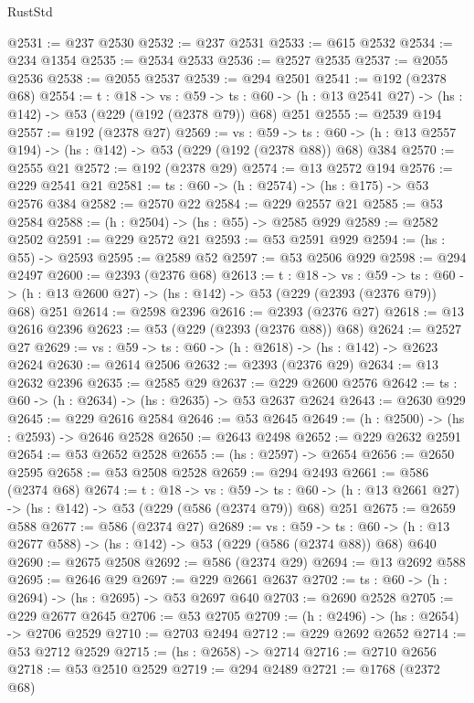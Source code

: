 \begin{lexlean}{RustStd}
\begin{coremodule}
@2531 := @237 @2530
@2532 := @237 @2531
@2533 := @615 @2532
@2534 := @234 @1354
@2535 := @2534 @2533
@2536 := @2527 @2535
@2537 := @2055 @2536
@2538 := @2055 @2537
@2539 := @294 @2501
@2541 := @192 (@2378 @68)
@2554 := {t : @18} ->
  {vs : @59} ->
  {ts : @60} -> (h : @13 @2541 @27) -> (hs : @142) -> @53 (@229 (@192 (@2378 @79)) @68) @251
@2555 := @2539 @194
@2557 := @192 (@2378 @27)
@2569 := {vs : @59} ->
  {ts : @60} -> (h : @13 @2557 @194) -> (hs : @142) -> @53 (@229 (@192 (@2378 @88)) @68) @384
@2570 := @2555 @21
@2572 := @192 (@2378 @29)
@2574 := @13 @2572 @194
@2576 := @229 @2541 @21
@2581 := {ts : @60} -> (h : @2574) -> (hs : @175) -> @53 @2576 @384
@2582 := @2570 @22
@2584 := @229 @2557 @21
@2585 := @53 @2584
@2588 := (h : @2504) -> (hs : @55) -> @2585 @929
@2589 := @2582 @2502
@2591 := @229 @2572 @21
@2593 := @53 @2591 @929
@2594 := (hs : @55) -> @2593
@2595 := @2589 @52
@2597 := @53 @2506 @929
@2598 := @294 @2497
@2600 := @2393 (@2376 @68)
@2613 := {t : @18} ->
  {vs : @59} ->
  {ts : @60} -> (h : @13 @2600 @27) -> (hs : @142) -> @53 (@229 (@2393 (@2376 @79)) @68) @251
@2614 := @2598 @2396
@2616 := @2393 (@2376 @27)
@2618 := @13 @2616 @2396
@2623 := @53 (@229 (@2393 (@2376 @88)) @68)
@2624 := @2527 @27
@2629 := {vs : @59} -> {ts : @60} -> (h : @2618) -> (hs : @142) -> @2623 @2624
@2630 := @2614 @2506
@2632 := @2393 (@2376 @29)
@2634 := @13 @2632 @2396
@2635 := @2585 @29
@2637 := @229 @2600 @2576
@2642 := {ts : @60} -> (h : @2634) -> (hs : @2635) -> @53 @2637 @2624
@2643 := @2630 @929
@2645 := @229 @2616 @2584
@2646 := @53 @2645
@2649 := (h : @2500) -> (hs : @2593) -> @2646 @2528
@2650 := @2643 @2498
@2652 := @229 @2632 @2591
@2654 := @53 @2652 @2528
@2655 := (hs : @2597) -> @2654
@2656 := @2650 @2595
@2658 := @53 @2508 @2528
@2659 := @294 @2493
@2661 := @586 (@2374 @68)
@2674 := {t : @18} ->
  {vs : @59} ->
  {ts : @60} -> (h : @13 @2661 @27) -> (hs : @142) -> @53 (@229 (@586 (@2374 @79)) @68) @251
@2675 := @2659 @588
@2677 := @586 (@2374 @27)
@2689 := {vs : @59} ->
  {ts : @60} -> (h : @13 @2677 @588) -> (hs : @142) -> @53 (@229 (@586 (@2374 @88)) @68) @640
@2690 := @2675 @2508
@2692 := @586 (@2374 @29)
@2694 := @13 @2692 @588
@2695 := @2646 @29
@2697 := @229 @2661 @2637
@2702 := {ts : @60} -> (h : @2694) -> (hs : @2695) -> @53 @2697 @640
@2703 := @2690 @2528
@2705 := @229 @2677 @2645
@2706 := @53 @2705
@2709 := (h : @2496) -> (hs : @2654) -> @2706 @2529
@2710 := @2703 @2494
@2712 := @229 @2692 @2652
@2714 := @53 @2712 @2529
@2715 := (hs : @2658) -> @2714
@2716 := @2710 @2656
@2718 := @53 @2510 @2529
@2719 := @294 @2489
@2721 := @1768 (@2372 @68)

\end{coremodule}
\end{lexlean}
